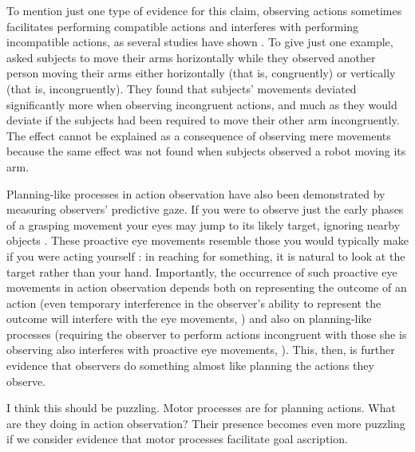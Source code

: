 \documentclass[12pt,\papersize]{extarticle}
\begin{document}
To mention just one type of evidence for this claim,
observing actions sometimes facilitates performing compatible actions and interferes with performing incompatible actions, as several studies have shown \citep{brass:2000_compatibility, craighero:2002_hand, kilner:2003_interference, costantini:2012_does}. 
To give just one example, \citet{kilner:2003_interference} asked subjects to move their arms horizontally while they observed another person moving their arms either horizontally (that is, congruently) or vertically (that is, incongruently). 
They found that subjects' movements deviated significantly more when observing incongruent actions, and much as they would deviate if the subjects had been required to move their other arm incongruently. 
The effect cannot be explained as a consequence of observing mere movements because the same effect was not found when subjects observed a robot moving its arm.

Planning-like processes in action observation have also been demonstrated by measuring observers’ predictive gaze.  If you were to observe just the early phases of a grasping movement your eyes may jump to its likely target, ignoring nearby objects \citep{ambrosini:2011_grasping}. These proactive eye movements resemble those you would typically make if you were acting yourself \citep{Flanagan:2003lm}: in reaching for something, it is natural to look at the target rather than your hand.  Importantly, the occurrence of such proactive eye movements in action observation depends both on representing the outcome of an action (even temporary interference in the observer's ability to represent the outcome will interfere with the eye movements, \citealp{Costantini:2012fk}) and also on planning-like processes (requiring the observer to perform actions incongruent with those she is observing also interferes with proactive eye movements, \citealp{Costantini:2012uq}).  This, then, is further evidence that observers do something almost like planning the actions they observe.  

I think this should be puzzling.
Motor processes are for planning actions.
What are they doing in action observation?
Their presence becomes even more puzzling if we consider evidence that motor processes facilitate goal ascription.
\end{document}
